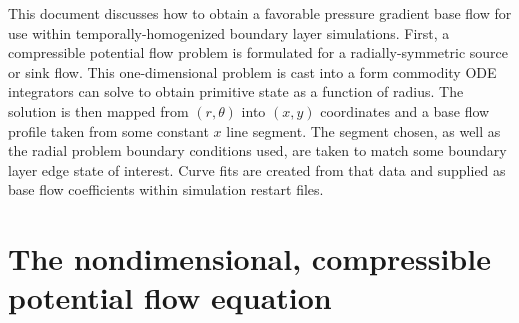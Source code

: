 \documentclass[letterpaper,11pt,nointlimits,reqno]{amsart}
\begin{document}
This document discusses how to obtain a favorable pressure gradient base flow
for use within temporally-homogenized boundary layer simulations.  First, a
compressible potential flow problem is formulated for a radially-symmetric
source or sink flow.  This one-dimensional problem is cast into a form
commodity ODE integrators can solve to obtain primitive state as a function of
radius.  The solution is then mapped from $\left(r,\theta\right)$ into
$\left(x,y\right)$ coordinates and a base flow profile taken from some constant
$x$ line segment.  The segment chosen, as well as the radial problem boundary
conditions used, are taken to match some boundary layer edge state of interest.
Curve fits are created from that data and supplied as base flow coefficients
within simulation restart files.

\section{The nondimensional, compressible potential flow equation}
\end{document}

